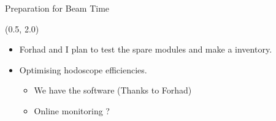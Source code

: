 \documentclass[12pt, xcolor={dvipsnames}, aspectratio = 169]{beamer}
\begin{document}
\begin{frame}{Preparation for Beam Time}

\begin{textblock}{14.0}(0.5, 2.0)

\begin{itemize}

\item Forhad and I plan to test the spare modules and make a inventory.

\item Optimising hodoscope efficiencies.

\begin{itemize}
    \item We have the software (Thanks to Forhad)
    \item Online monitoring ?
\end{itemize}

\end{itemize}

\end{textblock}

\end{frame}
\end{document}
